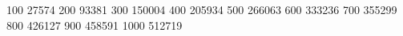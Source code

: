  100 27574
 200 93381
 300 150004
 400 205934
 500 266063
 600 333236
 700 355299
 800 426127
 900 458591
 1000 512719
